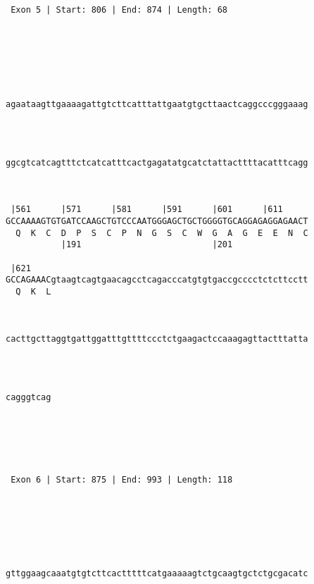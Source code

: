\documentclass{article}
\begin{document}
\begin{Verbatim}
               
  



 Exon 5 | Start: 806 | End: 874 | Length: 68 





   
                                                            
agaataagttgaaaagattgtcttcatttattgaatgtgcttaactcaggcccgggaaag
                                                            
                                                            
   
                                                            
ggcgtcatcagtttctcatcatttcactgagatatgcatctattacttttacatttcagg
                                                            
                                                            
   
 |561      |571      |581      |591      |601      |611     
GCCAAAAGTGTGATCCAAGCTGTCCCAATGGGAGCTGCTGGGGTGCAGGAGAGGAGAACT
  Q  K  C  D  P  S  C  P  N  G  S  C  W  G  A  G  E  E  N  C
           |191                          |201               
   
 |621                                                       
GCCAGAAACgtaagtcagtgaacagcctcagacccatgtgtgaccgcccctctcttcctt
  Q  K  L                                                   
                                                            
   
                                                            
cacttgcttaggtgattggatttgttttccctctgaagactccaaagagttactttatta
                                                            
                                                            
   
         
cagggtcag
         
         
  



 Exon 6 | Start: 875 | End: 993 | Length: 118 





   
                                                            
gttggaagcaaatgtgtcttcactttttcatgaaaaagtctgcaagtgctctgcgacatc
                                                            
                                                            
   

\end{Verbatim}
\end{document}
